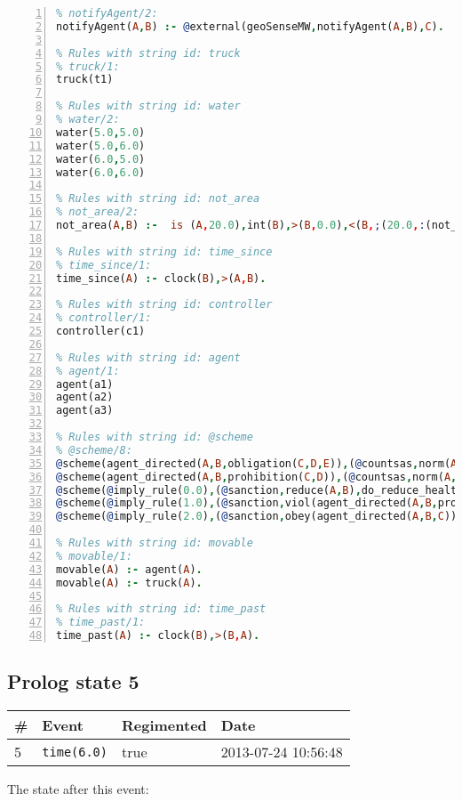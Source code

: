\documentclass[11pt]{article}\usepackage[utf8]{inputenc}\usepackage{geometry}
\begin{document}
\begin{lstlisting}[language=Prolog, numbers=left]
% Rules with string id: notifyAgent
% notifyAgent/2:
notifyAgent(A,B) :- @external(geoSenseMW,notifyAgent(A,B),C).

% Rules with string id: truck
% truck/1:
truck(t1)

% Rules with string id: water
% water/2:
water(5.0,5.0)
water(5.0,6.0)
water(6.0,5.0)
water(6.0,6.0)

% Rules with string id: not_area
% not_area/2:
not_area(A,B) :-  is (A,20.0),int(B),>(B,0.0),<(B,;(20.0,:(not_area(A,B), is (-(B),20.0)))),int(A),>(A,0.0),<(A,;(20.0,:(area(A,B),-(int(A))))),int(B),>(A,0.0),>(B,0.0),<(A,21.0),<(B,21.0).

% Rules with string id: time_since
% time_since/1:
time_since(A) :- clock(B),>(A,B).

% Rules with string id: controller
% controller/1:
controller(c1)

% Rules with string id: agent
% agent/1:
agent(a1)
agent(a2)
agent(a3)

% Rules with string id: @scheme
% @scheme/8:
@scheme(agent_directed(A,B,obligation(C,D,E)),(@countsas,norm(A,B,F,obligation(C,D,E)),F),false,(listTrue(C)),(time_past(D)),false,[plus(viol(agent_directed(A,B,obligation(C,D,E))))|[]],[plus(obey(agent_directed(A,B,obligation(C,D,E))))|[]])
@scheme(agent_directed(A,B,prohibition(C,D)),(@countsas,norm(A,B,E,prohibition(C,D)),E),(listTrue(C)),false,(false),false,[plus(viol(agent_directed(A,B,prohibition(C,D))))|[]],[plus(obey(agent_directed(A,B,prohibition(C,D))))|[]])
@scheme(@imply_rule(0.0),(@sanction,reduce(A,B),do_reduce_health(A,B),notifyAgent(A,changed(status))),true,false,false,false,[min(reduce(A,B))|[]],[])
@scheme(@imply_rule(1.0),(@sanction,viol(agent_directed(A,B,prohibition(C,D))),do_sanction(D)),true,false,false,false,[min(viol(agent_directed(A,B,prohibition(C,D))))|[]],[])
@scheme(@imply_rule(2.0),(@sanction,obey(agent_directed(A,B,C))),true,false,false,false,[min(obey(agent_directed(A,B,C)))|[]],[])

% Rules with string id: movable
% movable/1:
movable(A) :- agent(A).
movable(A) :- truck(A).

% Rules with string id: time_past
% time_past/1:
time_past(A) :- clock(B),>(B,A).

\end{lstlisting}
\clearpage 
\subsection{Prolog state 5}
\begin{table}[ht]
\centering 
\begin{tabular}{l l l l} 
\textbf{\#} & \textbf{Event} & \textbf{Regimented} & \textbf{Date} \\ [0.5ex] 
\hline
5&\texttt{time(6.0)}&true&2013-07-24 10:56:48\\ [1ex] \hline\end{tabular}
\end{table}
The state after this event:
\end{document}

